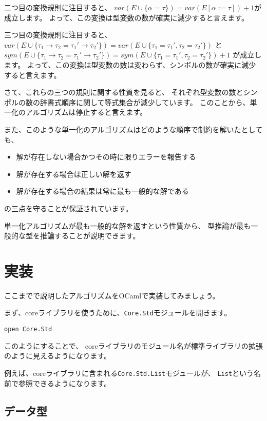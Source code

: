 二つ目の変換規則に注目すると、
$\mathit{var}(E \cup \{\alpha = \tau\}) = \mathit{var}(E[\alpha := \tau])+1$が成立します。
よって、この変換は型変数の数が確実に減少すると言えます。

三つ目の変換規則に注目すると、
$\mathit{var}(E \cup \{\tau_1 \to \tau_2 = \tau_1' \to \tau_2'\}) =
\mathit{var}(E \cup \{\tau_1 = \tau_1', \tau_2 = \tau_2'\})$
と
$\mathit{sym}(E \cup \{\tau_1 \to \tau_2 = \tau_1' \to \tau_2'\}) =
\mathit{sym}(E \cup \{\tau_1 = \tau_1', \tau_2 = \tau_2'\})+1$
が成立します。
よって、この変換は型変数の数は変わらず、シンボルの数が確実に減少すると言えます。

さて、これらの三つの規則に関する性質を見ると、
それぞれ型変数の数とシンボルの数の辞書式順序に関して等式集合が減少しています。
このことから、単一化のアルゴリズムは停止すると言えます。

また、このような単一化のアルゴリズムはどのような順序で制約を解いたとしても、
\begin{itemize}
  \item 解が存在しない場合かつその時に限りエラーを報告する
  \item 解が存在する場合は正しい解を返す
  \item 解が存在する場合の結果は常に最も一般的な解である
\end{itemize}
の三点を守ることが保証されています。

単一化アルゴリズムが最も一般的な解を返すという性質から、
型推論が最も一般的な型を推論することが説明できます。

\section{実装}

ここまでで説明したアルゴリズムをOCamlで実装してみましょう。

まず、coreライブラリを使うために、\texttt{Core.Std}モジュールを開きます。

\begin{lstlisting}
open Core.Std
\end{lstlisting}

このようにすることで、
coreライブラリのモジュール名が標準ライブラリの拡張のように見えるようになります。

例えば、coreライブラリに含まれる\texttt{Core.Std.List}モジュールが、
\texttt{List}という名前で参照できるようになります。

\subsection{データ型}

